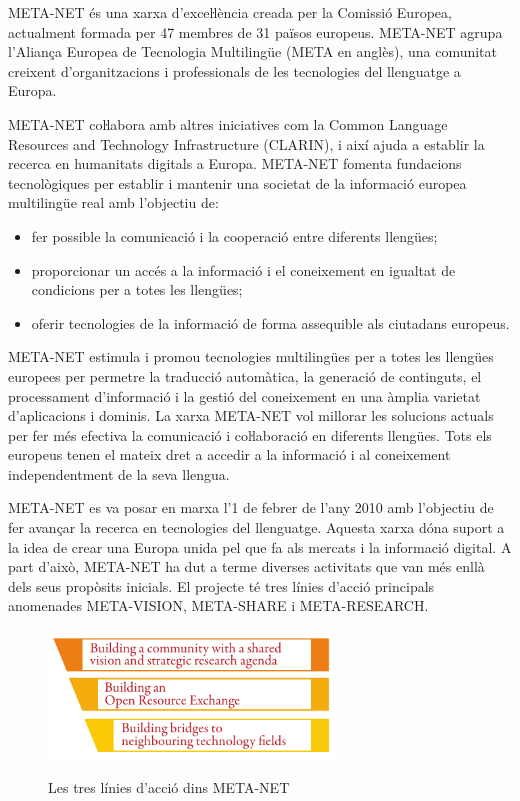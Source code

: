 \begin{multicols}{2}

META-NET és una xarxa d’exceŀlència creada per la Comissió Europea, actualment formada per 47 membres de 31 països europeus. META-NET agrupa l’Aliança Europea de Tecnologia Multilingüe (META en anglès), una comunitat creixent d’organitzacions i professionals de les tecnologies del llenguatge a Europa. 

META-NET coŀlabora amb altres iniciatives com la Common Language Resources and Technology Infrastructure (CLARIN), i així ajuda a establir la recerca en humanitats digitals a Europa. META-NET fomenta fundacions tecnològiques per establir i mantenir una societat de la informació europea multilingüe real amb l’objectiu de:
\begin{itemize}
\item fer possible la comunicació i la cooperació entre diferents llengües;
\item proporcionar un accés a la informació i el coneixement en igualtat de condicions per a totes les llengües;
\item oferir tecnologies de la informació de forma assequible als ciutadans europeus.
\end{itemize}

META-NET estimula i promou tecnologies multilingües per a totes les llengües europees per permetre la traducció automàtica, la generació de continguts, el processament d’informació i la gestió del coneixement en una àmplia varietat d’aplicacions i dominis. La xarxa META-NET vol millorar les solucions actuals per fer més efectiva la comunicació i coŀlaboració en diferents llengües. Tots els europeus tenen el mateix dret a accedir a la informació i al coneixement independentment de la seva llengua. 

META-NET es va posar en marxa l’1 de febrer de l’any 2010 amb l’objectiu de fer avançar la recerca en tecnologies del llenguatge. Aquesta xarxa dóna suport a la idea de crear una Europa unida pel que fa als mercats i la informació digital. A part d’això, META-NET ha dut a terme diverses activitats que van més enllà dels seus propòsits inicials. El projecte té tres línies d’acció principals anomenades META-VISION, META-SHARE i META-RESEARCH.

\begin{figure}[!ht]
\begin{center}
  \includegraphics[width=3.0in]{../_media/meta_3lines}\\
  \caption{Les tres línies d'acció dins META-NET}
  \label{fig:metanetactionlines_ca}
\end{center}
\end{figure}



\end{multicols}
